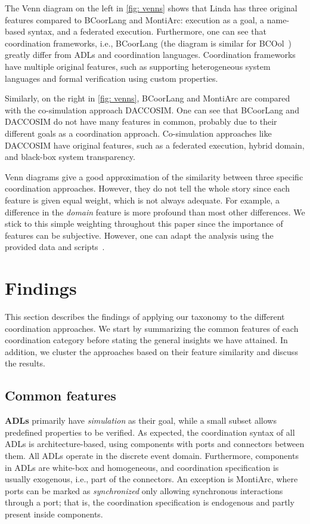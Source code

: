 \documentclass[runningheads]{llncs}
\begin{document}
The Venn diagram on the left in \autoref{fig: venns} shows that Linda has three original features compared to BCoorLang and MontiArc: execution as a goal, a name-based syntax, and a federated execution.
Furthermore, one can see that coordination frameworks, i.e., BCoorLang (the diagram is similar for BCOol~\cite{varalarsenBehavioralCoordinationOperator2015,varalarsenBCOolBehavioralCoordination2016}) greatly differ from ADLs and coordination languages.
Coordination frameworks have multiple original features, such as supporting heterogeneous system languages and formal verification using custom properties.

Similarly, on the right in \autoref{fig: venns}, BCoorLang and MontiArc are compared with the co-simulation approach DACCOSIM.
One can see that BCoorLang and DACCOSIM do not have many features in common, probably due to their different goals as a coordination approach.
Co-simulation approaches like DACCOSIM have original features, such as a federated execution, hybrid domain, and black-box system transparency.

Venn diagrams give a good approximation of the similarity between three specific coordination approaches.
However, they do not tell the whole story since each feature is given equal weight, which is not always adequate.
For example, a difference in the \textit{domain} feature is more profound than most other differences.
We stick to this simple weighting throughout this paper since the importance of features can be subjective.
However, one can adapt the analysis using the provided data and scripts~\cite{krauterCoordination2024Artifacts2024}.

\section{Findings} \label{sec: findings}

This section describes the findings of applying our taxonomy to the different coordination approaches.
We start by summarizing the common features of each coordination category before stating the general insights we have attained.
In addition, we cluster the approaches based on their feature similarity and discuss the results.

\subsection{Common features}

\textbf{ADLs} primarily have \textit{simulation} as their goal, while a small subset allows predefined properties to be verified.
As expected, the coordination syntax of all ADLs is architecture-based, using components with ports and connectors between them.
All ADLs operate in the discrete event domain.
Furthermore, components in ADLs are white-box and homogeneous, and coordination specification is usually exogenous, i.e., part of the connectors.
An exception is MontiArc, where ports can be marked as \textit{synchronized} only allowing synchronous interactions through a port; that is, the coordination specification is endogenous and partly present inside components.
\end{document}
